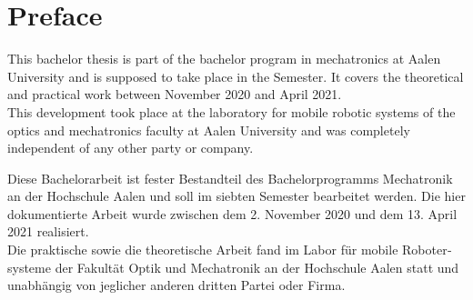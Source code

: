 \chapter*{Preface}
\label{preface}

This bachelor thesis is part of the bachelor program in mechatronics at Aalen University and is supposed to take place in the  Semester. It covers the theoretical and practical work between November  2020 and April  2021.\\

This development took place at the laboratory for mobile robotic systems of the optics and mechatronics faculty at Aalen University and was completely independent of any other party or company.

\vspace*{25mm}

\begin{otherlanguage}{ngerman}
Diese Bachelorarbeit ist fester Bestandteil des Bachelorprogramms Mechatronik an der Hochschule Aalen und soll im siebten Semester bearbeitet werden. Die hier dokumentierte Arbeit wurde zwischen dem 2. November 2020 und dem 13. April 2021 realisiert.\\

Die praktische sowie die theoretische Arbeit fand im Labor für mobile Robotersysteme der Fakultät Optik und Mechatronik an der Hochschule Aalen statt und unabhängig von jeglicher anderen dritten Partei oder Firma.
\end{otherlanguage}